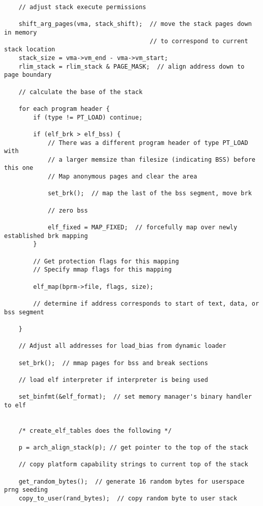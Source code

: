 \documentclass[a4paper]{article}
\begin{document}
{\begin{verbatim}
    // adjust stack execute permissions
    
    shift_arg_pages(vma, stack_shift);  // move the stack pages down in memory 
                                        // to correspond to current stack location
    stack_size = vma->vm_end - vma->vm_start;
    rlim_stack = rlim_stack & PAGE_MASK;  // align address down to page boundary
    
    // calculate the base of the stack
    
    for each program header {
        if (type != PT_LOAD) continue;
        
        if (elf_brk > elf_bss) {
            // There was a different program header of type PT_LOAD with 
            // a larger memsize than filesize (indicating BSS) before this one
            // Map anonymous pages and clear the area
            
            set_brk();  // map the last of the bss segment, move brk
            
            // zero bss
            
            elf_fixed = MAP_FIXED;  // forcefully map over newly established brk mapping
        }
        
        // Get protection flags for this mapping
        // Specify mmap flags for this mapping
        
        elf_map(bprm->file, flags, size); 
        
        // determine if address corresponds to start of text, data, or bss segment             
                
    }
    
    // Adjust all addresses for load_bias from dynamic loader
        
    set_brk();  // mmap pages for bss and break sections
        
    // load elf interpreter if interpreter is being used
        
    set_binfmt(&elf_format);  // set memory manager's binary handler to elf
    
    
    /* create_elf_tables does the following */
    
    p = arch_align_stack(p); // get pointer to the top of the stack
    
    // copy platform capability strings to current top of the stack
    
    get_random_bytes();  // generate 16 random bytes for userspace prng seeding
    copy_to_user(rand_bytes);  // copy random byte to user stack
    

\end{verbatim}}
\end{document}
